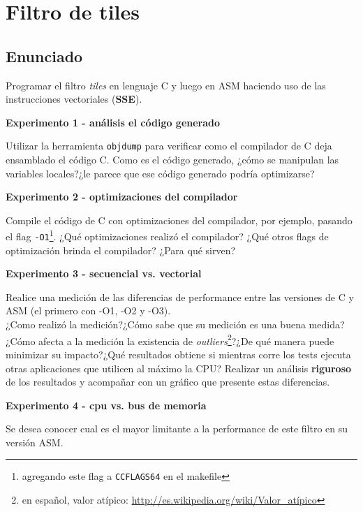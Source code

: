 \section{Filtro de tiles}
\subsection{Enunciado}

 Programar el filtro \textit{tiles} en lenguaje C y luego en ASM haciendo uso de las instrucciones vectoriales (\textbf{SSE}).

\vspace*{0.3cm} \noindent
\textbf{Experimento 1 - análisis el código generado}

Utilizar la herramienta \verb|objdump| para verificar como el compilador de C deja ensamblado el código C. Como es el código generado, ¿cómo se manipulan las variables locales?¿le parece que ese código generado podría optimizarse?

\vspace*{0.3cm} \noindent
\textbf{Experimento 2 - optimizaciones del compilador}

Compile el código de C con optimizaciones del compilador, por ejemplo, pasando el flag \verb|-O1|\footnote{agregando este flag a \texttt{CCFLAGS64} en el makefile}. 
¿Qué optimizaciones realizó el compilador?
¿Qué otros flags de optimización brinda el compilador?
¿Para qué sirven?


\vspace*{0.3cm} \noindent
\textbf{Experimento 3 - secuencial vs. vectorial}

	Realice una medición de las diferencias de performance entre las versiones
	de C y ASM (el primero con -O1, -O2 y -O3).\\
	¿Como realizó la medición?¿Cómo sabe que su medición es una buena medida?¿Cómo afecta a la medición la existencia de \emph{outliers}\footnote{en español, valor atípico: \url{http://es.wikipedia.org/wiki/Valor_atípico}}?¿De qué manera puede minimizar su impacto?¿Qué resultados obtiene si mientras corre los tests ejecuta otras aplicaciones que utilicen al máximo la CPU? 
	Realizar un análisis \textbf{riguroso} de los resultados y acompañar con un gráfico que presente estas diferencias.


\vspace*{0.3cm} \noindent
\textbf{Experimento 4 - cpu vs. bus de memoria}

	Se desea conocer cual es el mayor limitante a la performance de este filtro en su versión ASM.

